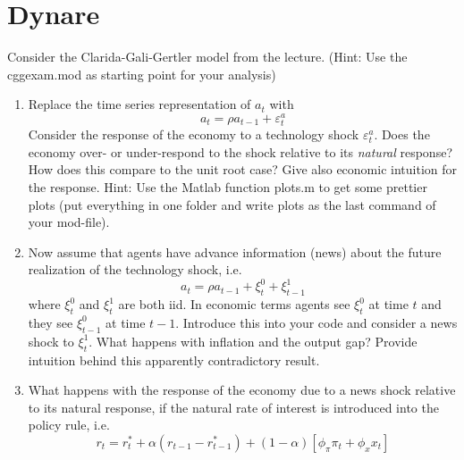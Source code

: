 \documentclass[10pt,a4paper]{article}
\begin{document}
\section{Dynare}
Consider the Clarida-Gali-Gertler model from the lecture. (Hint: Use the cggexam.mod as starting point for your analysis)
\begin{enumerate}
  \item Replace the time series representation of $a_t$ with $$a_t = \rho a_{t-1} + \varepsilon_{t}^a$$ Consider the response of the economy to a technology shock $\varepsilon_t^a$. Does the economy over- or under-respond to the shock relative to its \emph{natural} response? How does this compare to the unit root case? Give also economic intuition for the response. Hint: Use the Matlab function plots.m to get some prettier plots (put everything in one folder and write plots as the last command of your mod-file).
  \item Now assume that agents have advance information (news) about the future realization of the technology shock, i.e.
  $$ a_t = \rho a_{t-1} + \xi_t^0 + \xi_{t-1}^1$$ where $\xi_t^0$ and $\xi_t^1$ are both iid. In economic terms agents see $\xi_t^0$ at time $t$ and they see $\xi_{t-1}^0$ at time $t-1$. Introduce this into your code and consider a news shock to $\xi_t^1$. What happens with inflation and the output gap? Provide intuition behind this apparently contradictory result.
  \item What happens with the response of the economy due to a news shock relative to its natural response, if the natural rate of interest is introduced into the policy rule, i.e.
   \begin{equation*} r_{t} = r_t^{\ast} + \alpha (r_{t-1}-r^\ast_{t-1})+(1-\alpha )\left[ \phi _{\pi }\pi _{t}+\phi _{x}x_{t}\right]\end{equation*}
\end{enumerate}
\newpage
\end{document}
